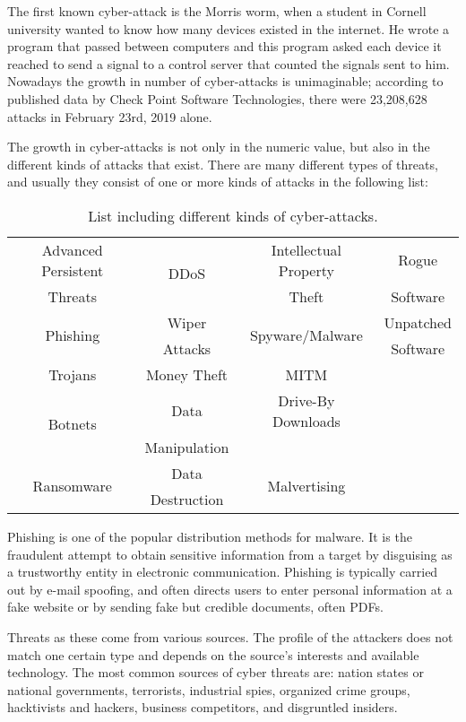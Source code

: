 \documentclass{article}
\begin{document}
\indent The first known cyber-attack is the Morris worm, when a student in Cornell university wanted to know how many devices existed in the internet. He wrote a program that passed between computers and this program asked each device it reached to send a signal to a control server that counted the signals sent to him. Nowadays the growth in number of cyber-attacks is unimaginable; according to published data by Check Point Software Technologies, there were 23,208,628 attacks in February 23rd, 2019 alone.

\indent The growth in cyber-attacks is not only in the numeric value, but also in the different kinds of attacks that exist. There are many different types of threats, and usually they consist of one or more kinds of attacks in the following list:

\begin{table}[htb]
\centering
\begin{tabular}[c]{|c|c|c|c|}
\hline
Advanced Persistent & \multirow{ 2}{*}{DDoS} & Intellectual Property & Rogue \\
Threats & & Theft & Software\\
\hline
\multirow{ 2}{*}{Phishing} & Wiper & \multirow{ 2}{*}{Spyware/Malware} & Unpatched \\
 & Attacks & & Software \\
\hline
Trojans & Money Theft & MITM &  \\
\hline
\multirow{ 2}{*}{Botnets} & Data & Drive-By Downloads &  \\
 & Manipulation & & \\
\hline
\multirow{ 2}{*}{Ransomware} & Data & \multirow{ 2}{*}{Malvertising} &  \\
 & Destruction & & \\ 
\hline
\end{tabular}
\caption{List including different kinds of cyber-attacks.}
\end{table}


\indent Phishing is one of the popular distribution methods for malware. It is the fraudulent attempt to obtain sensitive information from a target by disguising as a trustworthy entity in electronic communication. Phishing is typically carried out by e-mail spoofing, and often directs users to enter personal information at a fake website or by sending fake but credible documents, often PDFs.

\indent Threats as these come from various sources. The profile of the attackers does not match one certain type and depends on the source's interests and available technology. The most common sources of cyber threats are: nation states or national governments, terrorists, industrial spies, organized crime groups, hacktivists and hackers, business competitors, and disgruntled insiders.
\end{document}
